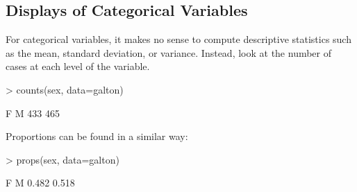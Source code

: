 \subsection{Displays of Categorical Variables}

For categorical variables, it makes no sense to compute descriptive
statistics such as the mean, standard deviation, or variance.
Instead, look at the number of cases at each level of the variable.
\begin{Schunk}
\begin{Sinput}
> counts(sex, data=galton)
\end{Sinput}
\begin{Soutput}
  F   M 
433 465 
\end{Soutput}
\end{Schunk}
Proportions can be found in a similar way:
\begin{Schunk}
\begin{Sinput}
> props(sex, data=galton)
\end{Sinput}
\begin{Soutput}
    F     M 
0.482 0.518 
\end{Soutput}
\end{Schunk}




